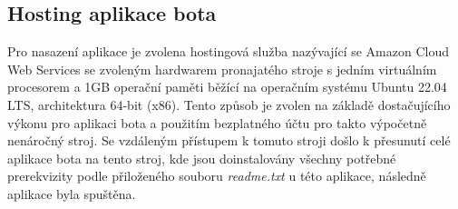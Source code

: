 \documentclass[
  program=inf,
biblatex=false,
sourcecodes=true,
joinlists=true,
  figures=true,
  tables=true,
  glossaries=true,
  index=false
]{kidiplom}
\begin{document}
\subsection{Hosting aplikace bota}
Pro nasazení aplikace je zvolena hostingová služba nazývající se Amazon Cloud Web Services \cite{aws} se
zvoleným hardwarem pronajatého stroje s jedním virtuálním procesorem a 1GB operační paměti běžící na operačním systému
Ubuntu 22.04 LTS, architektura 64-bit (x86). Tento způsob je zvolen na základě dostačujícího výkonu pro aplikaci bota
a použitím bezplatného účtu pro takto výpočetně nenáročný stroj. Se vzdáleným přístupem k tomuto stroji došlo k přesunutí
celé aplikace bota na tento stroj, kde jsou doinstalovány všechny potřebné prerekvizity podle přiloženého souboru {\it readme.txt}
u této aplikace, následně aplikace byla spuštěna.






\end{document}
